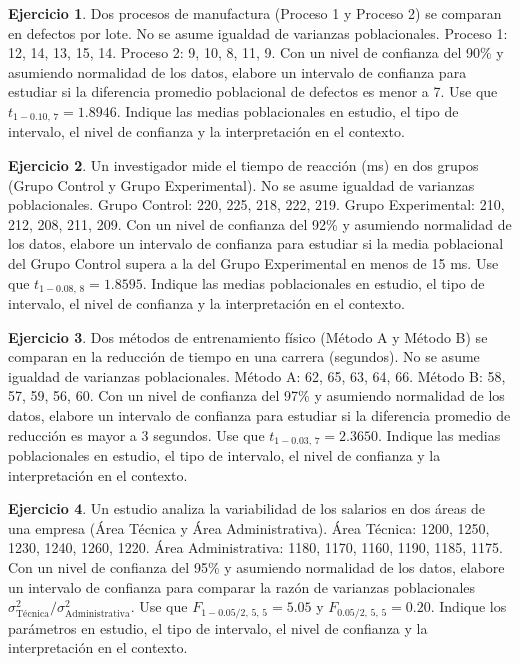 \documentclass[
  11pt,
]{book}
\theoremstyle{definition}
\theoremstyle{definition}
\theoremstyle{definition}
\newtheorem{exercise}{Ejercicio}[chapter]
\theoremstyle{definition}
\theoremstyle{remark}
\begin{document}
\begin{exercise}
Dos procesos de manufactura (Proceso 1 y Proceso 2) se comparan en defectos por lote. No se asume igualdad de varianzas poblacionales. Proceso 1: 12, 14, 13, 15, 14. Proceso 2: 9, 10, 8, 11, 9. Con un nivel de confianza del 90\% y asumiendo normalidad de los datos, elabore un intervalo de confianza para estudiar si la diferencia promedio poblacional de defectos es menor a 7. Use que \(t_{1-0.10,\,7} = 1.8946\). Indique las medias poblacionales en estudio, el tipo de intervalo, el nivel de confianza y la interpretación en el contexto.
\end{exercise}

\begin{exercise}
Un investigador mide el tiempo de reacción (ms) en dos grupos (Grupo Control y Grupo Experimental). No se asume igualdad de varianzas poblacionales. Grupo Control: 220, 225, 218, 222, 219. Grupo Experimental: 210, 212, 208, 211, 209. Con un nivel de confianza del 92\% y asumiendo normalidad de los datos, elabore un intervalo de confianza para estudiar si la media poblacional del Grupo Control supera a la del Grupo Experimental en menos de 15 ms. Use que \(t_{1-0.08,\,8} = 1.8595\). Indique las medias poblacionales en estudio, el tipo de intervalo, el nivel de confianza y la interpretación en el contexto.
\end{exercise}

\begin{exercise}
Dos métodos de entrenamiento físico (Método A y Método B) se comparan en la reducción de tiempo en una carrera (segundos). No se asume igualdad de varianzas poblacionales. Método A: 62, 65, 63, 64, 66. Método B: 58, 57, 59, 56, 60. Con un nivel de confianza del 97\% y asumiendo normalidad de los datos, elabore un intervalo de confianza para estudiar si la diferencia promedio de reducción es mayor a 3 segundos. Use que \(t_{1-0.03,\,7} = 2.3650\). Indique las medias poblacionales en estudio, el tipo de intervalo, el nivel de confianza y la interpretación en el contexto.
\end{exercise}

\begin{exercise}
Un estudio analiza la variabilidad de los salarios en dos áreas de una empresa (Área Técnica y Área Administrativa). Área Técnica: 1200, 1250, 1230, 1240, 1260, 1220. Área Administrativa: 1180, 1170, 1160, 1190, 1185, 1175. Con un nivel de confianza del 95\% y asumiendo normalidad de los datos, elabore un intervalo de confianza para comparar la razón de varianzas poblacionales \(\sigma^2_{\text{Técnica}}/\sigma^2_{\text{Administrativa}}\). Use que \(F_{1-0.05/2,\,5,\,5} = 5.05\) y \(F_{0.05/2,\,5,\,5} = 0.20\). Indique los parámetros en estudio, el tipo de intervalo, el nivel de confianza y la interpretación en el contexto.
\end{exercise}
\end{document}
